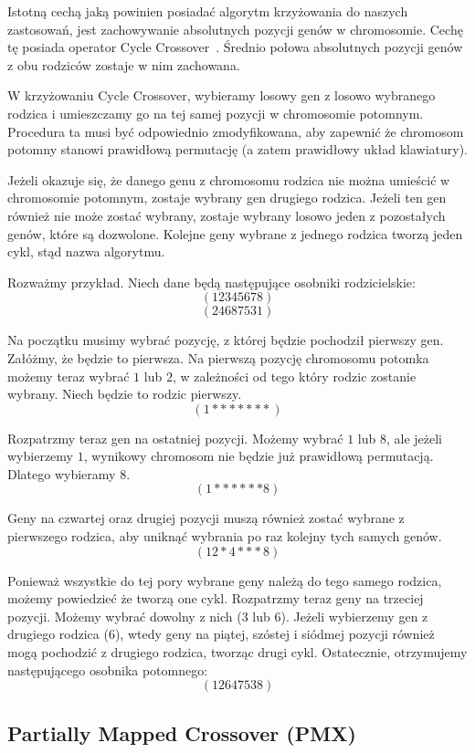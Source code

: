 \documentclass[brudnopis]{xmgr}
\begin{document}
Istotną cechą jaką powinien posiadać algorytm krzyżowania do naszych zastosowań, jest zachowywanie absolutnych pozycji genów w chromosomie. Cechę tę posiada operator Cycle Crossover~\cite{Larranaga99geneticalgorithms}. Średnio połowa absolutnych pozycji genów z obu rodziców zostaje w nim zachowana.

W krzyżowaniu Cycle Crossover, wybieramy losowy gen z losowo wybranego rodzica i umieszczamy go na tej samej pozycji w chromosomie potomnym. Procedura ta musi być odpowiednio zmodyfikowana, aby zapewnić że chromosom potomny stanowi prawidłową permutację (a zatem prawidłowy układ klawiatury).

Jeżeli okazuje się, że danego genu z chromosomu rodzica nie można umieścić w chromosomie potomnym, zostaje wybrany gen drugiego rodzica. Jeżeli ten gen również nie może zostać wybrany, zostaje wybrany losowo jeden z pozostałych genów, które są dozwolone. Kolejne geny wybrane z jednego rodzica tworzą jeden cykl, stąd nazwa algorytmu.

Rozważmy przykład. Niech dane będą następujące osobniki rodzicielskie:
$$ (1 2 3 4 5 6 7 8) $$
$$ (2 4 6 8 7 5 3 1) $$

Na początku musimy wybrać pozycję, z której będzie pochodził pierwszy gen. Załóżmy, że będzie to pierwsza. Na pierwszą pozycję chromosomu potomka możemy teraz wybrać $1$ lub $2$, w zależności od tego który rodzic zostanie wybrany. Niech będzie to rodzic pierwszy.
$$ (1 * * * * * * *) $$

Rozpatrzmy teraz gen na ostatniej pozycji. Możemy wybrać $1$ lub $8$, ale jeżeli wybierzemy $1$, wynikowy chromosom nie będzie już prawidłową permutacją. Dlatego wybieramy $8$.
$$ (1 * * * * * * 8) $$

Geny na czwartej oraz drugiej pozycji muszą również zostać wybrane z pierwszego rodzica, aby uniknąć wybrania po raz kolejny tych samych genów.
$$ (1 2 * 4 * * * 8) $$

Ponieważ wszystkie do tej pory wybrane geny należą do tego samego rodzica, możemy powiedzieć że tworzą one cykl. Rozpatrzmy teraz geny na trzeciej pozycji. Możemy wybrać dowolny z nich ($3$ lub $6$). Jeżeli wybierzemy gen z drugiego rodzica ($6$), wtedy geny na piątej, szóstej i siódmej pozycji również mogą pochodzić z drugiego rodzica, tworząc drugi cykl. Ostatecznie, otrzymujemy następującego osobnika potomnego:
$$ (1 2 6 4 7 5 3 8) $$


\subsection{Partially Mapped Crossover (PMX)}
\end{document}
